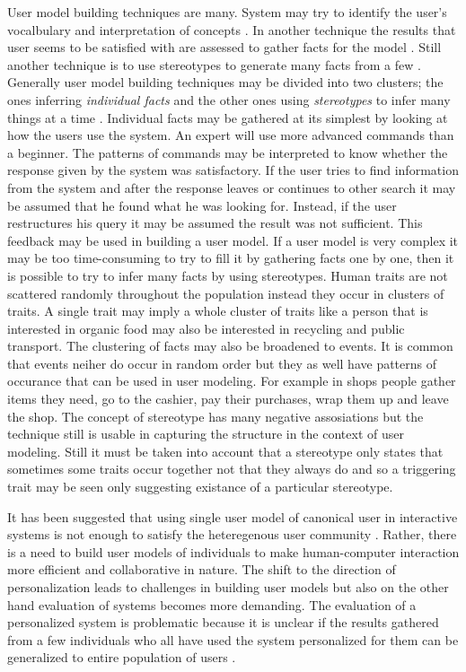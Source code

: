 \documentclass{sigchi}
\begin{document}
User model building techniques are many. System may try to identify the user's vocalbulary and interpretation of concepts \cite{rich99}. In another technique the results that user seems to be satisfied with are assessed to gather facts for the model \cite{rich99}. Still another technique is to use stereotypes to generate many facts from a few \cite{rich99}. Generally user model building techniques may be divided into two clusters; the ones inferring \textit{individual facts} and the other ones using \textit{stereotypes} to infer many things at a time \cite{rich99}. Individual facts may be gathered at its simplest by looking at how the users use the system. An expert will use more advanced commands than a beginner. The patterns of commands may be interpreted to know whether the response given by the system was satisfactory. If the user tries to find information from the system and after the response leaves or continues to other search it may be assumed that he found what he was looking for. Instead, if the user restructures his query it may be assumed the result was not sufficient. This feedback may be used in building a user model. If a user model is very complex it may be too time-consuming to try to fill it by gathering facts one by one, then it is possible to try to infer many facts by using stereotypes. Human traits are not scattered randomly throughout the population instead they occur in clusters of traits. A single trait may imply a whole cluster of traits like a person that is interested in organic food may also be interested in recycling and public transport.  The clustering of facts may also be broadened to events. It is common that events neiher do occur in random order but they as well have patterns of occurance that can be used in user modeling. For example in shops people gather items they need, go to the cashier, pay their purchases, wrap them up and leave the shop. The concept of stereotype has many negative assosiations but the technique still is usable in capturing the structure in the context of user modeling. Still it must be taken into account that a stereotype only states that sometimes some traits occur together not that they always do and so a triggering trait may be seen only suggesting existance of a particular stereotype. 

It has been suggested that using single user model of canonical user in interactive systems is not enough to satisfy the heteregenous user community \cite{rich99}. Rather, there is a need to build user models of individuals to make human-computer interaction more efficient and collaborative in nature. 
The shift to the direction of personalization leads to challenges in building user models but also on the other hand evaluation of systems becomes more demanding. The evaluation of a personalized system is problematic because it is unclear if the results gathered from a few individuals who all have used the system personalized for them can be generalized to entire population of users \cite{van08}.
\end{document}
